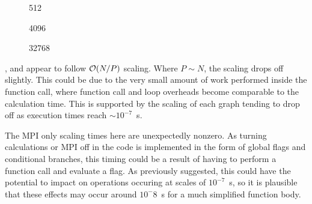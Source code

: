 %
%
\begin{figure}[!h]
    
    \caption{
        \vZeroTimeCaption
            {\systolicloop{}}
            {\individualoperation{}}
            {512}
    }
    \label{fig:v0_systolic_individual_operation_512_logtime}
\end  {figure}

\begin{figure}[!h]
    
    \caption{
        \vZeroTimeCaption
            {\systolicloop{}}
            {\individualoperation{}}
            {4096}
    }
    \label{fig:v0_systolic_individual_operation_4096_logtime}
\end  {figure}

\begin{figure}[!h]
    
    \caption{
        \vZeroTimeCaption
            {\systolicloop{}}
            {\individualoperation{}}
            {32768}
    }
    \label{fig:v0_systolic_individual_operation_32768_logtime}
\end  {figure}

\vZeroTimeExplanation
    {}
    {}
    {}
    {\individualoperation{}}
    {\systolicloop{}}


%
,
 and
appear to follow $\mathcal{O}{\left({ N/P }\right)}$ scaling.
%
Where $P \sim{} N$, the scaling drops off slightly.
%
This could be due to the very small amount of work performed
inside the function call, where function call and loop overheads
become comparable to the calculation time.
%
This is supported by the scaling of each graph tending to drop off
as execution times reach $\sim{} 10^{-7}$~s.

The MPI only scaling times here are unexpectedly nonzero.
%
As turning calculations or MPI off in the code is implemented in
the form of global flags and conditional branches, this timing
could be a result of having to perform a function call and
evaluate a flag.
%
As previously suggested, this could have the potential to impact on
operations occuring at scales of $10^{-7}$~s, so it is plausible
that these effects may occur around $10^-{8}$~s for a much simplified
function body.


